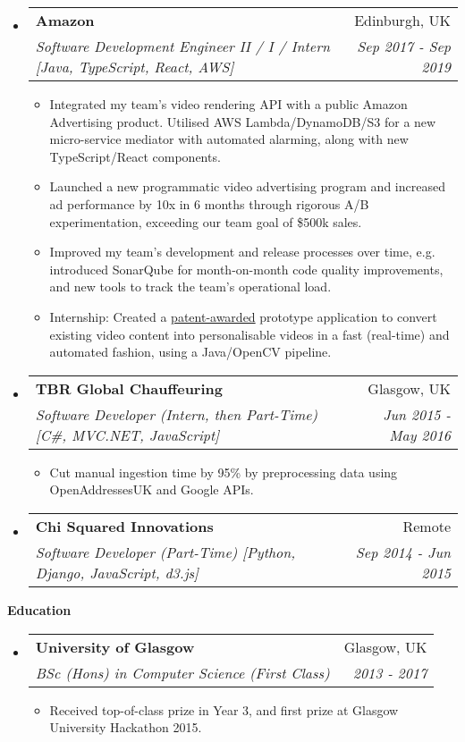 \documentclass[letterpaper,11pt]{article}
\makeatletter
\newcommand{\resitem}[1]{\item #1 \vspace{-2pt}}
\newcommand{\resheading}[1]{{\large \colorbox{mygrey}{\begin{minipage}{\textwidth}{\textbf{#1 \vphantom{p\^{E}}}}\end{minipage}}}}
\newcommand{\ressubheading}[4]{
\begin{tabular*}{7.0in}{l@{\extracolsep{\fill}}r}
	\textbf{#1} & #2 \\
	\textit{#3} & \textit{#4} \\
\end{tabular*}\vspace{-6pt}}
\makeatother
\begin{document}
\begin{itemize}
		\item
		\ressubheading{Amazon}{Edinburgh, UK}{Software Development Engineer II / I / Intern [Java, TypeScript, React, AWS]}{Sep 2017 - Sep 2019}
		\begin{itemize}
			\resitem{Integrated my team's video rendering API with a public Amazon Advertising product. Utilised AWS Lambda/DynamoDB/S3 for a new micro-service mediator with automated alarming, along with new TypeScript/React components.}
			\resitem{Launched a new programmatic video advertising program and increased ad performance by 10x in 6 months through rigorous A/B experimentation, exceeding our team goal of \$500k sales.}
			\resitem{Improved my team's development and release processes over time, e.g. introduced SonarQube for month-on-month code quality improvements, and new tools to track the team's operational load.}
			\resitem{Internship: Created a \href{https://pdfpiw.uspto.gov/.piw?PageNum=0&docid=10297026&IDKey=E3B5AD2132FF&HomeUrl=\%2F\%2Fpatft.uspto.gov\%2Fnetahtml\%2FPTO\%2Fpatimg.htm}{patent-awarded} prototype application to convert existing video content into personalisable videos in a fast (real-time)
			and automated fashion, using a Java/OpenCV pipeline.}
		\end{itemize}

		\item
		\ressubheading{TBR Global Chauffeuring}{Glasgow, UK}{Software Developer (Intern, then Part-Time) [C\#, MVC.NET, JavaScript]}{Jun 2015 - May 2016}
		\begin{itemize}
			\resitem{Cut manual ingestion time by 95\% by preprocessing data using OpenAddressesUK and Google APIs.}
		\end{itemize}

		\item
		\ressubheading{Chi Squared Innovations}{Remote}{Software Developer (Part-Time) [Python, Django, JavaScript, d3.js]}{Sep 2014 - Jun 2015}

	\end{itemize}

	\resheading{Education}
	\begin{itemize}
		\item
		\ressubheading{University of Glasgow}{Glasgow, UK}{BSc (Hons) in Computer Science (First Class)}{2013 - 2017}
		\begin{itemize}
			\resitem{Received top-of-class prize in Year 3, and first prize at Glasgow University Hackathon 2015.}
		\end{itemize}
	\end{itemize}
\end{document}
